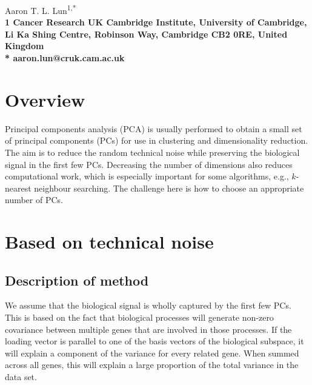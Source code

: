 \documentclass{article}
\begin{document}
\vspace*{0.35in}

\begin{flushleft}
{\Large
\textbf{}
}
\newline

Aaron T. L. Lun\textsuperscript{1,*}
\\
\bigskip
\bf{1} Cancer Research UK Cambridge Institute, University of Cambridge, Li Ka Shing Centre, Robinson Way, Cambridge CB2 0RE, United Kingdom
\\
\bigskip
* aaron.lun@cruk.cam.ac.uk

\end{flushleft}

\section{Overview}
Principal components analysis (PCA) is usually performed to obtain a small set of principal components (PCs) for use in clustering and dimensionality reduction.
The aim is to reduce the random technical noise while preserving the biological signal in the first few PCs.
Decreasing the number of dimensions also reduces computational work, which is especially important for some algorithms, e.g., $k$-nearest neighbour searching.
The challenge here is how to choose an appropriate number of PCs.

\section{Based on technical noise}
\label{sec:noise}

\subsection{Description of method}

We assume that the biological signal is wholly captured by the first few PCs.
This is based on the fact that biological processes will generate non-zero covariance between multiple genes that are involved in those processes.
If the loading vector is parallel to one of the basis vectors of the biological subspace, it will explain a component of the variance for every related gene.
When summed across all genes, this will explain a large proportion of the total variance in the data set.
\end{document}
